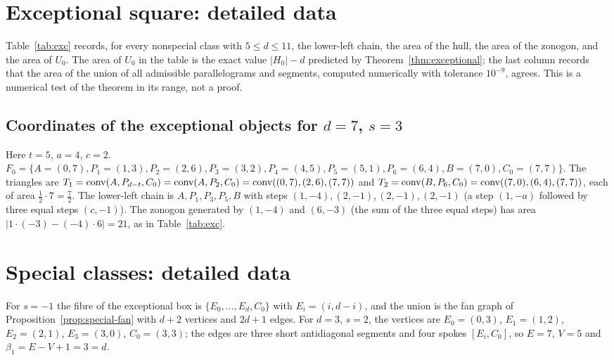 \section{Exceptional square: detailed data}\label{app:exceptional}

Table~\ref{tab:exc} records, for every nonspecial class with $5\le d\le11$, the lower-left chain, the area of the hull, the area of the zonogon, and the area of $U_0$. The area of $U_0$ in the table is the exact value $|H_0|-d$ predicted by Theorem~\ref{thm:exceptional}; the last column records that the area of the union of all admissible parallelograms and segments, computed numerically with tolerance $10^{-9}$, agrees. This is a numerical test of the theorem in its range, not a proof.



\subsection{\texorpdfstring{Coordinates of the exceptional objects for $d=7$, $s=3$}{Coordinates of the exceptional objects for d = 7, s = 3}}

Here $t=5$, $a=4$, $c=2$. $F_0=\{A=(0,7),P_1=(1,3),P_2=(2,6),P_3=(3,2),P_4=(4,5),P_5=(5,1),P_6=(6,4),B=(7,0),C_0=(7,7)\}$. The triangles are $T_1=\operatorname{conv}(A,P_{d-t},C_0)=\operatorname{conv}(A,P_2,C_0)=\operatorname{conv}((0,7),(2,6),(7,7))$ and $T_2=\operatorname{conv}(B,P_6,C_0)=\operatorname{conv}((7,0),(6,4),(7,7))$, each of area $\tfrac12\cdot7=\tfrac72$. The lower-left chain is $A,P_1,P_3,P_5,B$ with steps $(1,-4),(2,-1),(2,-1),(2,-1)$ (a step $(1,-a)$ followed by three equal steps $(c,-1)$). The zonogon generated by $(1,-4)$ and $(6,-3)$ (the sum of the three equal steps) has area $|1\cdot(-3)-(-4)\cdot6|=21$, as in Table~\ref{tab:exc}.

\section{Special classes: detailed data}\label{app:special}



For $s=-1$ the fibre of the exceptional box is $\{E_0,\dots,E_d,C_0\}$ with $E_i=(i,d-i)$, and the union is the fan graph of Proposition~\ref{prop:special-fan} with $d+2$ vertices and $2d+1$ edges. For $d=3$, $s=2$, the vertices are $E_0=(0,3)$, $E_1=(1,2)$, $E_2=(2,1)$, $E_3=(3,0)$, $C_0=(3,3)$; the edges are three short antidiagonal segments and four spokes $[E_i,C_0]$, so $E=7$, $V=5$ and $\beta_1=E-V+1=3=d$.

